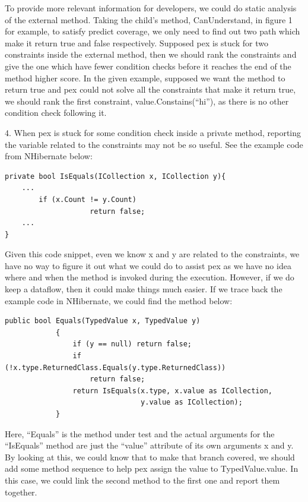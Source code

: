 To provide more relevant information for developers, we could do static analysis of the external method. Taking the child's method, CanUnderstand, in figure 1 for example, to satisfy predict coverage, we only need to find out two path which make it return true and false respectively. Supposed pex is stuck for two constraints inside the external method, then we should rank the constraints and give the one which have fewer condition checks before it reaches the end of the method higher score. In the given example, supposed we want the method to return true and pex could not solve all the constraints that make it return true, we should rank the first constraint, value.Constains(``hi''), as there is no other condition check following it. 

4. When pex is stuck for some condition check inside a private method, reporting the variable related to the constraints may not be so useful. See the example code from NHibernate below:

\begin{verbatim}
private bool IsEquals(ICollection x, ICollection y){
	... 
		if (x.Count != y.Count)
					return false;
	...
}
\end{verbatim}

Given this code snippet, even we know x and y are related to the constraints, we have no way to figure it out what we could do to assist pex as we have no idea where and when the method is invoked during the execution. However, if we do keep a dataflow, then it could make things much easier. If we trace back the example code in NHibernate, we could find the method below:

\begin{verbatim}
public bool Equals(TypedValue x, TypedValue y)
			{
				if (y == null) return false;
				if (!x.type.ReturnedClass.Equals(y.type.ReturnedClass))
					return false;
				return IsEquals(x.type, x.value as ICollection, 
								y.value as ICollection);
			}
\end{verbatim}

Here, ``Equals'' is the method under test and the actual arguments for the ``IsEquals'' method are just the ``value'' attribute of its own arguments x and y. By looking at this, we could know that to make that branch covered, we should add some method sequence to help pex assign the value to TypedValue.value. In this case, we could link the second method to the first one and report them together.

